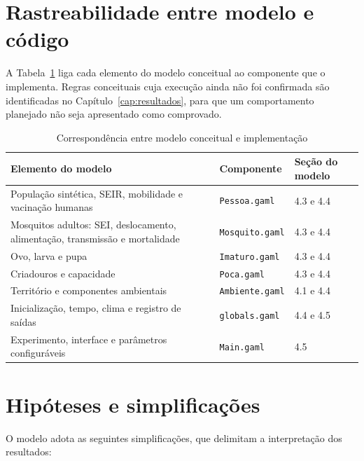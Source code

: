 \section{Rastreabilidade entre modelo e código}

A Tabela~\ref{tab:rastreabilidade} liga cada elemento do modelo conceitual ao componente que o implementa. Regras conceituais cuja execução ainda não foi confirmada são identificadas no Capítulo~\ref{cap:resultados}, para que um comportamento planejado não seja apresentado como comprovado.

\begin{table}[htb]
    \centering
    \caption{Correspondência entre modelo conceitual e implementação}
    \label{tab:rastreabilidade}
    \begin{tabular}{p{5.6cm} p{3.2cm} p{5.0cm}}
        \hline
        \textbf{Elemento do modelo} & \textbf{Componente} & \textbf{Seção do modelo} \\
        \hline
        População sintética, SEIR, mobilidade e vacinação humanas & \texttt{Pessoa.gaml} & 4.3 e 4.4 \\
        Mosquitos adultos: SEI, deslocamento, alimentação, transmissão e mortalidade & \texttt{Mosquito.gaml} & 4.3 e 4.4 \\
        Ovo, larva e pupa & \texttt{Imaturo.gaml} & 4.3 e 4.4 \\
        Criadouros e capacidade & \texttt{Poca.gaml} & 4.3 e 4.4 \\
        Território e componentes ambientais & \texttt{Ambiente.gaml} & 4.1 e 4.4 \\
        Inicialização, tempo, clima e registro de saídas & \texttt{globals.gaml} & 4.4 e 4.5 \\
        Experimento, interface e parâmetros configuráveis & \texttt{Main.gaml} & 4.5 \\
        \hline
    \end{tabular}
\end{table}

\section{Hipóteses e simplificações}

O modelo adota as seguintes simplificações, que delimitam a interpretação dos resultados:

